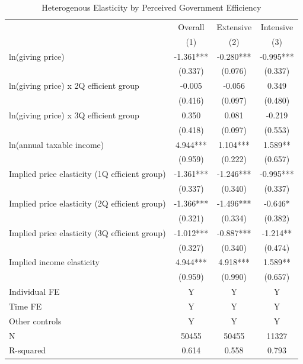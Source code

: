 \documentclass[ review  , 3p ]{elsarticle}
\begin{document}
  \begin{table}

  \caption{\label{tab:kableHeteroElasticity}Heterogenous Elasticity by Perceived Government Efficiency}
  \centering
  \fontsize{8}{10}\selectfont
  \begin{threeparttable}
  \begin{tabular}[t]{lccc}
  \toprule
  \multicolumn{1}{c}{ } & \multicolumn{1}{c}{Overall} & \multicolumn{1}{c}{Extensive} & \multicolumn{1}{c}{Intensive} \\
  \cmidrule(l{3pt}r{3pt}){2-2} \cmidrule(l{3pt}r{3pt}){3-3} \cmidrule(l{3pt}r{3pt}){4-4}
   & (1) & (2) & (3)\\
  \midrule
  ln(giving price) & -1.361*** & -0.280*** & -0.995***\\
   & (0.337) & (0.076) & (0.337)\\
  ln(giving price) x 2Q efficient group & -0.005 & -0.056 & 0.349\\
   & (0.416) & (0.097) & (0.480)\\
  ln(giving price) x 3Q efficient group & 0.350 & 0.081 & -0.219\\
   & (0.418) & (0.097) & (0.553)\\
  ln(annual taxable income) & 4.944*** & 1.104*** & 1.589**\\
   & (0.959) & (0.222) & (0.657)\\
  Implied price elasticity (1Q efficient group) & -1.361*** & -1.246*** & -0.995***\\
   & (0.337) & (0.340) & (0.337)\\
  Implied price elasticity (2Q efficient group) & -1.366*** & -1.496*** & -0.646*\\
   & (0.321) & (0.334) & (0.382)\\
  Implied price elasticity (3Q efficient group) & -1.012*** & -0.887*** & -1.214**\\
   & (0.327) & (0.340) & (0.474)\\
  Implied income elasticity & 4.944*** & 4.918*** & 1.589**\\
   & (0.959) & (0.990) & (0.657)\\
  Individual FE & Y & Y & Y\\
  Time FE & Y & Y & Y\\
  Other controls & Y & Y & Y\\
  N & 50455 & 50455 & 11327\\
  R-squared & 0.614 & 0.558 & 0.793\\
  \bottomrule
  \end{tabular}

\end{threeparttable}
\end{table}
\end{document}

